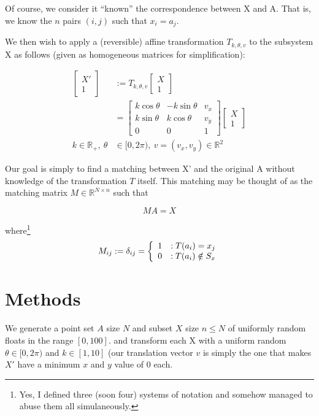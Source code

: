 \documentclass[10pt,twocolumn]{article}
\providecommand{\R}{\mathbb{R}}%
\begin{document}
Of course, we consider it ``known'' the correspondence between X and A. That
is, we know the $n$ pairs $(i,j)$ such that $x_i = a_j$.

We then wish to apply a (reversible) affine transformation $T_{k, \theta, v}$
to the subsystem X as follows (given as homogeneous matrices for
simplification):

\begin{equation}
  \begin{aligned}
    \begin{bmatrix}X' \\ 1\end{bmatrix} &:=  T_{k, \theta, v} \begin{bmatrix}X \\ 1\end{bmatrix} \\
    &= \begin{bmatrix}
  k\cos\theta & -k\sin\theta & v_x \\
  k\sin\theta & k\cos\theta & v_y \\
  0             &   0 & 1
\end{bmatrix} \begin{bmatrix}X\\1\end{bmatrix} \\
k \in \R_+, \ \theta &\in [0, 2\pi),  \ v = (v_x, v_y) \in \R^2
\end{aligned}
\end{equation}

Our goal is simply to find a matching between X' and the original A without
knowledge of the transformation $T$ itself. This matching may be thought of as
the matching matrix $M \in \R^{N\times n}$ such that

\begin{equation}
  MA = X
\end{equation}

where\footnote{Yes, I defined three (soon four) systems of notation and somehow managed to abuse them all simulaneously.}
\begin{equation}
  M_{ij} := \delta_{ij} \\
  = \left\{
    \begin{array}{lr}
    1 &: T(a_i) = x_j  \\
    0 &: T(a_i) \notin S_x
  \end{array}
  \right.
\end{equation}

\section{Methods}
We generate a point set $A$ size $N$ and subset $X$ size $n\leq N$ of uniformly
random floats in the range $[0,100]$. and transform each X with a uniform
random $\theta \in [0, 2\pi)$ and $k\in [1,10]$ (our translation vector $v$ is
simply the one that makes $X'$ have a minimum $x$ and $y$ value of 0 each.
\end{document}

